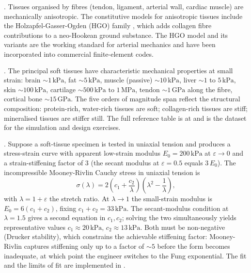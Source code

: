 . Tissues organised by fibres (tendon, ligament,
arterial wall, cardiac muscle) are mechanically anisotropic. The
constitutive models for anisotropic tissues include the
Holzapfel-Gasser-Ogden (HGO) family
\cite{paper:v6c05-holzapfel-hgo-2000}, which adds collagen fibre
contributions to a neo-Hookean ground substance. The HGO model and its
variants are the working standard for arterial mechanics and have
been incorporated into commercial finite-element codes.



. The principal soft tissues have
characteristic mechanical properties at small strain: brain
$\sim 1\,\text{kPa}$, fat $\sim 5\,\text{kPa}$, muscle (passive)
$\sim 10\,\text{kPa}$, liver $\sim 1$ to $5\,\text{kPa}$, skin
$\sim 100\,\text{kPa}$, cartilage $\sim 500\,\text{kPa}$ to
$1\,\text{MPa}$, tendon $\sim 1\,\text{GPa}$ along the fibre,
cortical bone $\sim 15\,\text{GPa}$. The five orders of magnitude
span reflect the structural composition: protein-rich, water-rich
tissues are soft; collagen-rich tissues are stiff; mineralised
tissues are stiffer still. The full reference table is at
 and is the dataset for
the simulation and design exercises.

. Suppose a soft-tissue specimen is tested in uniaxial tension
and produces a stress-strain curve with apparent low-strain modulus
$E_0 = 200\,\text{kPa}$ at $\varepsilon \to 0$ and a strain-stiffening
factor of $3$ (the secant modulus at $\varepsilon = 0.5$ equals
$3\,E_0$). The incompressible Mooney-Rivlin Cauchy stress in
uniaxial tension is
\[
\sigma(\lambda) = 2\!\left(c_1 + \frac{c_2}{\lambda}\right)
                  \!\left(\lambda^2 - \frac{1}{\lambda}\right),
\]
with $\lambda = 1 + \varepsilon$ the stretch ratio. At $\lambda \to 1$
the small-strain modulus is $E_0 = 6(c_1 + c_2)$, fixing
$c_1 + c_2 = 33\,\text{kPa}$. The secant-modulus condition at
$\lambda = 1.5$ gives a second equation in $c_1, c_2$; solving the
two simultaneously yields representative values $c_1 \approx
20\,\text{kPa}$, $c_2 \approx 13\,\text{kPa}$. Both must be
non-negative (Drucker stability), which constrains the achievable
stiffening factor: Mooney-Rivlin captures stiffening only up to a
factor of $\sim 5$ before the form becomes inadequate, at which
point the engineer switches to the Fung exponential. The fit and the
limits of fit are implemented in
.

